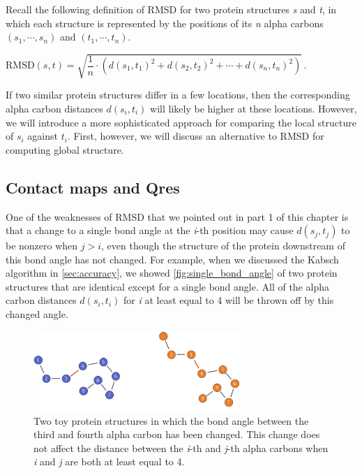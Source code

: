 \begin{qbox}\end{qbox}

Recall the following definition of RMSD for two protein structures \textit{s} and \textit{t}, in which each structure is represented by the positions of its \textit{n} alpha carbons $(s_{1}, \cdots, s_{n})$ and $(t_{1}, \cdots, t_{n})$.

\begin{center}
$\text{RMSD}(s, t) = \sqrt{\dfrac{1}{n} \cdot (d(s_1, t_1)^2 + d(s_2, t_2)^2 + \cdots + d(s_n, t_n)^2)}\,.$
\end{center}

If two similar protein structures differ in a few locations, then the corresponding alpha carbon distances $d(s_{i}, t_{i})$ will likely be higher at these locations. However, we will introduce a more sophisticated approach for
comparing the local structure of $s_{i}$ against $t_{i}$. First, however, we will discuss an alternative to RMSD for computing global structure.

\FloatBarrier
{}
\subsection{Contact maps and Qres}

One of the weaknesses of RMSD that we pointed out in part 1 of this chapter is that a change to a single bond angle at the \textit{i}-th position may cause $d(s_{j}, t_{j})$ to be nonzero when $j > i$, even though the structure of the protein downstream of this bond angle has not changed. For example, when we discussed the Kabsch algorithm in \autoref{sec:accuracy}, we showed \autoref{fig:single_bond_angle} of two protein structures that are identical except for a single bond angle. All of the alpha carbon distances $d(s_{i}, t_{i})$ for \textit{i} at least equal to 4 will be thrown off by this changed angle.

\begin{figure}[h]
	\centering
	\mySfFamily
	\includegraphics[width = 0.7\textwidth]{../images/single_bond_angle.png}
	\caption{Two toy protein structures in which the bond angle between the third and fourth alpha carbon has been changed. This change does not affect the distance between the \textit{i}-th and \textit{j}-th alpha carbons when \textit{i} and \textit{j} are both at least equal to 4.}
	\label{fig:single_bond_angle}
\end{figure}

